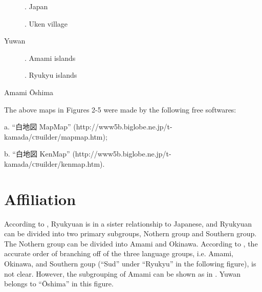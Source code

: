  

\begin{figure}
\textmd{. Japan}
\end{figure}

\begin{figure}
\textmd{. Uken village}
\end{figure}

Yuwan

  
              
 

\begin{figure}
\textmd{. Amami islands}
\end{figure}

\begin{figure}
\textmd{. Ryukyu islands}
\end{figure}

Amami Ōshima

The above maps in Figures 2-5 were made by the following free softwares:

a. “白地図 MapMap” (http://www5b.biglobe.ne.jp/t-kamada/\textsc{cb}uilder/mapmap.htm);

b. “白地図 KenMap” (http://www5b.biglobe.ne.jp/t-kamada/\textsc{cb}uilder/kenmap.htm).

\section{Affiliation}
\hypertarget{RefHeadingToc395696952}{}
According to \citet[771--774, 779--783]{Uemura1992}, Ryukyuan is in a sister relationship to Japanese, and Ryukyuan can be divided into two primary subgroups, Nothern group and Southern group. The Nothern group can be divided into Amami and Okinawa. According to \citet[263]{Pellard2009}, the accurate order of branching off of the three language groups, i.e. Amami, Okinawa, and Southern goup (“Sud” under “Ryukyu” in the following figure), is not clear. However, the subgrouping of Amami can be shown as in . Yuwan belongs to “Ōshima” in this figure.

